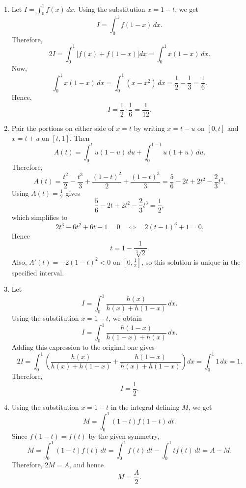 \documentclass[11pt,a4paper]{article}
\begin{document}
\begin{enumerate}
\[\]
Thus, the correct option is $e-1$.
\item Let $I=\int_0^1 f(x)\,dx$. Using the substitution $x=1-t$, we get
\[
I=\int_0^1 f(1-x)\,dx.
\]
Therefore,
\[
2I=\int_0^1\bigl[f(x)+f(1-x)\bigr]dx
=\int_0^1 x(1-x)\,dx.
\]
Now,
\[
\int_0^1 x(1-x)\,dx=\int_0^1(x-x^2)\,dx
=\frac12-\frac13=\frac16.
\]
Hence,
\[
I=\frac12\cdot\frac16=\frac1{12}.
\]
\item Pair the portions on either side of $x=t$ by writing $x=t-u$ on $[0,t]$ and $x=t+u$ on $[t,1]$. Then
\[
A(t)=\int_0^t u(1-u)\,du+\int_0^{1-t}u(1+u)\,du.
\]
Therefore,
\[
A(t)=\frac{t^2}{2}-\frac{t^3}{3}+\frac{(1-t)^2}{2}+\frac{(1-t)^3}{3}
=\frac56-2t+2t^2-\frac23t^3.
\]
Using $A(t)=\frac12$ gives
\[
\frac56-2t+2t^2-\frac23t^3=\frac12,
\]
which simplifies to
\[
2t^3-6t^2+6t-1=0
\quad\Longleftrightarrow\quad
2(t-1)^3+1=0.
\]
Hence
\[
t=1-\frac{1}{\sqrt[3]{2}}.
\]
Also, $A'(t)=-2(1-t)^2<0$ on $[0,\frac12]$, so this solution is unique in the specified interval.
\item Let
\[
I=\int_0^1\frac{h(x)}{h(x)+h(1-x)}\,dx.
\]
Using the substitution $x=1-t$, we obtain
\[
I=\int_0^1\frac{h(1-x)}{h(1-x)+h(x)}\,dx.
\]
Adding this expression to the original one gives
\[
2I=\int_0^1\left(\frac{h(x)}{h(x)+h(1-x)}+\frac{h(1-x)}{h(x)+h(1-x)}\right)dx
=\int_0^1 1\,dx=1.
\]
Therefore,
\[
I=\frac12.
\]
\item Using the substitution $x=1-t$ in the integral defining $M$, we get
\[
M=\int_0^1 (1-t)f(1-t)\,dt.
\]
Since $f(1-t)=f(t)$ by the given symmetry,
\[
M=\int_0^1 (1-t)f(t)\,dt
=\int_0^1 f(t)\,dt-\int_0^1 t f(t)\,dt=A-M.
\]
Therefore, $2M=A$, and hence
\[
\boxed{M=\frac{A}{2}}.
\]
\end{enumerate}
\end{document}
